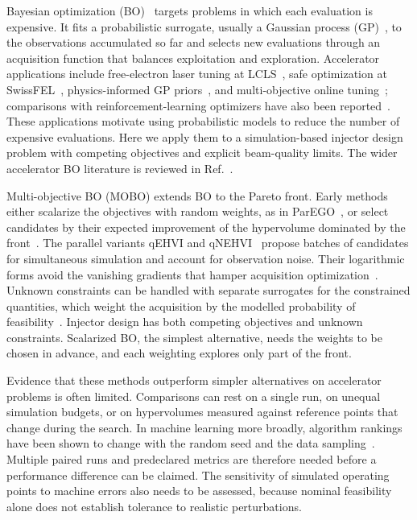 \documentclass[aps,prab,reprint,superscriptaddress,amsmath,amssymb,floatfix]{revtex4-2}
\begin{document}
Bayesian optimization (BO)~\cite{Jones1998,Snoek2012,Shahriari2016} targets problems in which
each evaluation is expensive. It fits a probabilistic surrogate, usually a Gaussian process
(GP)~\cite{Rasmussen2006}, to the observations accumulated so far and selects new evaluations
through an acquisition function that balances exploitation and exploration. Accelerator
applications include free-electron laser tuning at LCLS~\cite{McIntire2016,Duris2020}, safe
optimization at SwissFEL~\cite{Kirschner2019}, physics-informed GP priors~\cite{Hanuka2021}, and
multi-objective online tuning~\cite{Roussel2021}; comparisons with reinforcement-learning
optimizers have also been reported~\cite{Kaiser2024}. These applications motivate using
probabilistic models to reduce the number of expensive evaluations. Here we apply them to a
simulation-based
injector design problem with competing objectives and explicit beam-quality limits. The wider
accelerator BO literature is reviewed in Ref.~\cite{Roussel2024}.

Multi-objective BO (MOBO) extends BO to the Pareto front. Early methods either scalarize the
objectives with random weights, as in ParEGO~\cite{Knowles2006}, or select candidates by their
expected improvement of the hypervolume dominated by the front~\cite{Zitzler1999,Emmerich2006}.
The parallel variants qEHVI and qNEHVI~\cite{Daulton2020,Daulton2021} propose batches of
candidates for simultaneous simulation and account for observation noise. Their logarithmic
forms avoid the vanishing gradients that hamper acquisition optimization~\cite{Ament2023}.
Unknown constraints can be handled with separate surrogates for the constrained quantities,
which weight the acquisition by the modelled probability of
feasibility~\cite{Gardner2014,Gelbart2014,Daulton2021}. Injector design has both competing
objectives and unknown constraints. Scalarized BO, the simplest alternative, needs the weights
to be chosen in advance, and each weighting explores only part of the front.

Evidence that these methods outperform simpler alternatives on accelerator problems is often
limited. Comparisons can rest on a single run, on unequal simulation budgets, or on hypervolumes
measured against reference points that change during the search. In machine learning more
broadly, algorithm rankings have been shown to change with the random seed and the data
sampling~\cite{Henderson2018,Bouthillier2021}. Multiple paired runs and predeclared metrics are
therefore needed before a performance difference can be claimed. The sensitivity of simulated
operating points to machine errors also needs to be assessed, because nominal feasibility alone
does not establish tolerance to realistic perturbations.
\end{document}
